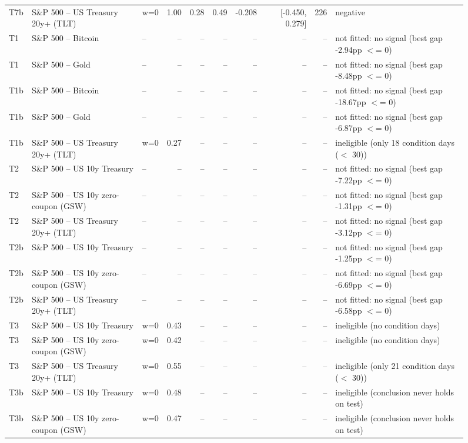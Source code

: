 \begin{figure}
\begin{tabular}{lllrrrrrrl}
T7b & S\&P 500 -- US Treasury 20y+ (TLT) & w=0 & 1.00 & 0.28 & 0.49 & -0.208 & [-0.450, 0.279] & 226 & negative \\
T1 & S\&P 500 -- Bitcoin & -- & -- & -- & -- & -- & -- & -- & not fitted: no signal (best gap -2.94pp $<$= 0) \\
T1 & S\&P 500 -- Gold & -- & -- & -- & -- & -- & -- & -- & not fitted: no signal (best gap -8.48pp $<$= 0) \\
T1b & S\&P 500 -- Bitcoin & -- & -- & -- & -- & -- & -- & -- & not fitted: no signal (best gap -18.67pp $<$= 0) \\
T1b & S\&P 500 -- Gold & -- & -- & -- & -- & -- & -- & -- & not fitted: no signal (best gap -6.87pp $<$= 0) \\
T1b & S\&P 500 -- US Treasury 20y+ (TLT) & w=0 & 0.27 & -- & -- & -- & -- & -- & ineligible (only 18 condition days ($<$ 30)) \\
T2 & S\&P 500 -- US 10y Treasury & -- & -- & -- & -- & -- & -- & -- & not fitted: no signal (best gap -7.22pp $<$= 0) \\
T2 & S\&P 500 -- US 10y zero-coupon (GSW) & -- & -- & -- & -- & -- & -- & -- & not fitted: no signal (best gap -1.31pp $<$= 0) \\
T2 & S\&P 500 -- US Treasury 20y+ (TLT) & -- & -- & -- & -- & -- & -- & -- & not fitted: no signal (best gap -3.12pp $<$= 0) \\
T2b & S\&P 500 -- US 10y Treasury & -- & -- & -- & -- & -- & -- & -- & not fitted: no signal (best gap -1.25pp $<$= 0) \\
T2b & S\&P 500 -- US 10y zero-coupon (GSW) & -- & -- & -- & -- & -- & -- & -- & not fitted: no signal (best gap -6.69pp $<$= 0) \\
T2b & S\&P 500 -- US Treasury 20y+ (TLT) & -- & -- & -- & -- & -- & -- & -- & not fitted: no signal (best gap -6.58pp $<$= 0) \\
T3 & S\&P 500 -- US 10y Treasury & w=0 & 0.43 & -- & -- & -- & -- & -- & ineligible (no condition days) \\
T3 & S\&P 500 -- US 10y zero-coupon (GSW) & w=0 & 0.42 & -- & -- & -- & -- & -- & ineligible (no condition days) \\
T3 & S\&P 500 -- US Treasury 20y+ (TLT) & w=0 & 0.55 & -- & -- & -- & -- & -- & ineligible (only 21 condition days ($<$ 30)) \\
T3b & S\&P 500 -- US 10y Treasury & w=0 & 0.48 & -- & -- & -- & -- & -- & ineligible (conclusion never holds on test) \\
T3b & S\&P 500 -- US 10y zero-coupon (GSW) & w=0 & 0.47 & -- & -- & -- & -- & -- & ineligible (conclusion never holds on test) \\

\end{tabular}
\end{figure}
